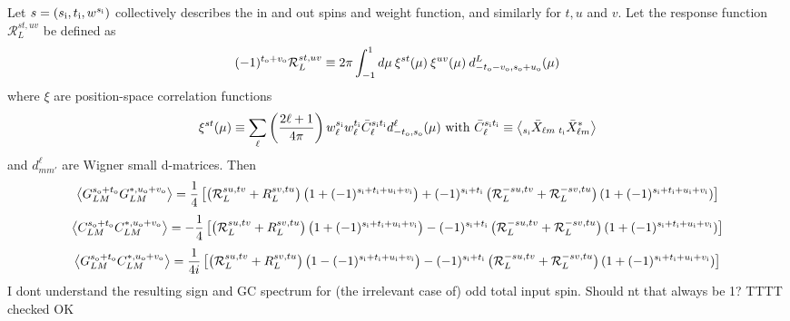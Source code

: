 \documentclass[reprint,prd, superscriptaddress, tightenlines, longbibliography, nofootinbib, eqsecnum, amsfonts, amsmath, floatfix, notitlepage, onecolumn]{revtex4-1}
\newcommand{\si}[0]{{s_{\rm i}}}
\newcommand{\ti}[0]{{t_{\rm i}}}
\newcommand{\ui}[0]{{u_{\rm i}}}
\newcommand{\vi}[0]{{v_{\rm i}}}
\newcommand{\so}[0]{{s_{\rm o}}}
\renewcommand{\to}[0]{{t_{\rm o}}}
\newcommand{\uo}[0]{{u_{\rm o}}}
\newcommand{\vo}[0]{{v_{\rm o}}}
\newcommand{\av}[1]{\left\langle #1 \right\rangle}
\newcommand{\JC}[1]{\color{red}#1\color{black}}
\begin{document}
Let $s = (\si, \ti, w^{\si})$ collectively describes the in and out spins and weight function, and similarly for $t, u$ and $v$. Let the response function $\mathcal R^{st, uv}_L$ be defined as
\begin{equation}
(-1)^{\to + \vo} \mathcal R_L^{st,uv} \equiv 2\pi  \int_{-1}^1 d \mu \:\xi^{st}(\mu)\:\xi^{uv}(\mu)\: d^L_{-\to - \vo, \so + \uo}(\mu) 
\end{equation}
where $\xi$ are position-space correlation functions
\begin{equation}
\xi^{st}(\mu) \equiv  \sum_\ell \left(\frac{2\ell + 1}{4\pi}\right)w^\si_\ell w^\ti_\ell \bar C_\ell^{\si \ti} d^\ell_{-\to,\so}(\mu)\textrm{ with } \bar C_\ell^{\si \ti} \equiv \av{ _{\si}\bar X_{\ell m}\: _{\ti} \bar X^*_{\ell m} }
\end{equation}
and $d^\ell_{mm'}$ are Wigner small d-matrices.
Then
\begin{equation}
	\av{G^{\so + \to}_{LM} G^{*, \uo + \vo}_{L M} } = \frac 14\left[ \left(\mathcal R^{su, tv}_L  + R^{sv, tu}_L\right)\left(1 + (-1)^{\si + \ti + \ui + \vi} \right)  + (-1)^{\si + \ti} \left(\mathcal R^{-su, tv}_L + \mathcal R_L^{-sv, tu} \right)(1 + (-1)^{\si + \ti + \ui + \vi}) \right]
\end{equation}
\begin{equation}
	\av{C^{\so + \to}_{LM} C^{*, \uo + \vo}_{L M} } =- \frac 14\left[ \left(\mathcal R^{su, tv}_L  + R^{sv, tu}_L\right)\left(1 + (-1)^{\si + \ti + \ui + \vi} \right)  - (-1)^{\si + \ti} \left(\mathcal R^{-su, tv}_L + \mathcal R_L^{-sv, tu} \right)(1 + (-1)^{\si + \ti + \ui + \vi}) \right]
\end{equation}
\begin{equation}
	\av{G^{\so + \to}_{LM} C^{*, \uo + \vo}_{L M} } = \frac 1{4i}\left[ \left(\mathcal R^{su, tv}_L  + R^{sv, tu}_L\right)\left(1 - (-1)^{\si + \ti + \ui + \vi} \right)  - (-1)^{\si + \ti} \left(\mathcal R^{-su, tv}_L + \mathcal R_L^{-sv, tu} \right)(1 + (-1)^{\si + \ti + \ui + \vi}) \right]
\end{equation}
\JC{I dont understand the resulting sign and GC spectrum for (the irrelevant case of) odd total input spin. Should nt that always be 1? TTTT checked OK}
\end{document}
